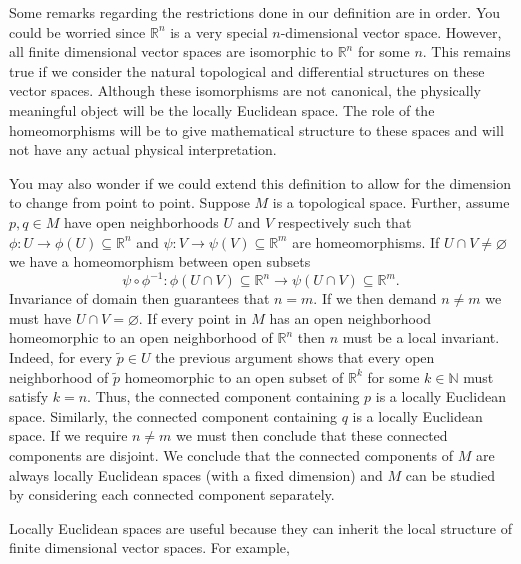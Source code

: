 Some remarks regarding the restrictions done in our definition are in order. You could be worried since $\mathbb{R}^n$ is a very special $n$-dimensional vector space. However, all finite dimensional vector spaces are isomorphic to $\mathbb{R}^n$ for some $n$. This remains true if we consider the natural topological and differential structures on these vector spaces. Although these isomorphisms are not canonical, the physically meaningful object will be the locally Euclidean space. The role of the homeomorphisms will be to give mathematical structure to these spaces and will not have any actual physical interpretation.

You may also wonder if we could extend this definition to allow for the dimension to change from point to point. Suppose $M$ is a topological space. Further, assume $p,q\in M$ have open neighborhoods $U$ and $V$ respectively such that $\phi:U\rightarrow\phi(U)\subseteq\mathbb{R}^n$ and $\psi:V\rightarrow\psi(V)\subseteq\mathbb{R}^m$ are homeomorphisms. If $U\cap V\neq\varnothing$ we have a homeomorphism between open subsets 
\begin{equation}
\psi\circ\phi^{-1}:\phi(U\cap V)\subseteq\mathbb{R}^n\rightarrow \psi(U\cap V)\subseteq\mathbb{R}^m.
\end{equation}
Invariance of domain then guarantees that $n=m$. If we then demand $n\neq m$ we must have $U\cap V=\varnothing$. If every point in $M$ has an open neighborhood homeomorphic to an open neighborhood of $\mathbb{R}^n$ then $n$ must be a local invariant. Indeed, for every $\tilde{p}\in U$ the previous argument shows that every open neighborhood of $\tilde{p}$ homeomorphic to an open subset of $\mathbb{R}^k$ for some $k\in\mathbb{N}$ must satisfy $k=n$. Thus, the connected component containing $p$ is a locally Euclidean space. Similarly, the connected component containing $q$ is a locally Euclidean space. If we require $n\neq m$ we must then conclude that these connected components are disjoint. We conclude that the connected components of $M$ are always locally Euclidean spaces (with a fixed dimension) and $M$ can be studied by considering each connected component separately.

Locally Euclidean spaces are useful because they can inherit the local structure of finite dimensional vector spaces. For example, 

 